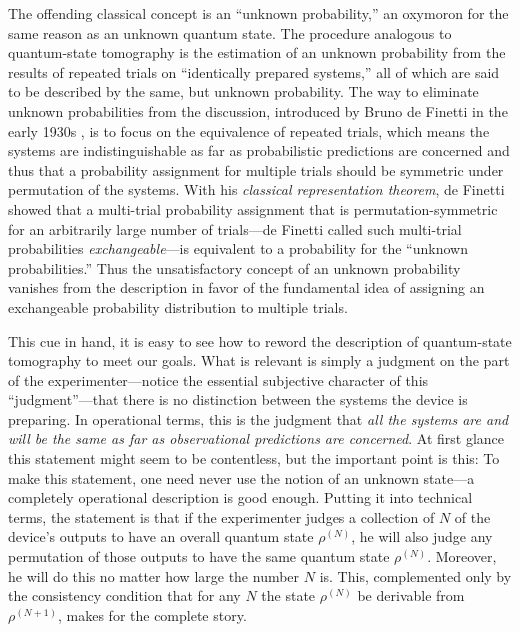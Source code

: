 The offending classical concept is an ``unknown probability,'' an
oxymoron for the same reason as an unknown quantum state.  The
procedure analogous to quantum-state tomography is the estimation of
an unknown probability from the results of repeated trials on
``identically prepared systems,'' all of which are said to be
described by the same, but unknown probability.  The way to
eliminate unknown probabilities from the discussion, introduced by
Bruno de Finetti in the early 1930s
\cite{DeFinetti1990,DeFinettiCollected}, is to focus on the
equivalence of repeated trials, which means the systems are
indistinguishable as far as probabilistic predictions are concerned
and thus that a probability assignment for multiple trials should be
symmetric under permutation of the systems.  With his {\it classical
representation theorem}, de Finetti \cite{DeFinetti1990} showed that
a multi-trial probability assignment that is permutation-symmetric
for an arbitrarily large number of trials---de Finetti called such
multi-trial probabilities {\it exchangeable\/}---is equivalent to a
probability for the ``unknown probabilities.''  Thus the
unsatisfactory concept of an unknown probability vanishes from the
description in favor of the fundamental idea of assigning an
exchangeable probability distribution to multiple trials.

This cue in hand, it is easy to see how to reword the description
of quantum-state tomography to meet our goals.  What is relevant
is simply a judgment on the part of the experimenter---notice the
essential subjective character of this ``judgment''---that there
is no distinction between the systems the device is preparing.  In
operational terms, this is the judgment that {\it all the systems
are and will be the same as far as observational predictions are
concerned}.  At first glance this statement might seem to be
contentless, but the important point is this: To make this
statement, one need never use the notion of an unknown state---a
completely operational description is good enough. Putting it into
technical terms, the statement is that if the experimenter judges
a collection of $N$ of the device's outputs to have an overall
quantum state $\rho^{(N)}$, he will also judge any permutation of
those outputs to have the same quantum state $\rho^{(N)}$.
Moreover, he will do this no matter how large the number $N$ is.
This, complemented only by the consistency condition that for any
$N$ the state $\rho^{(N)}$ be derivable from $\rho^{(N+1)}$, makes
for the complete story.

